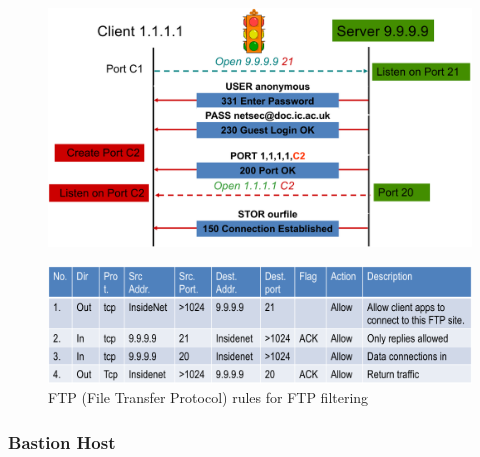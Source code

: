 \documentclass[twocolumn,landscape,10pt]{article}
\theoremstyle{definition}
\begin{document}
\begin{figure}[h]
  	\includegraphics[scale=0.24]{filtering_ftp.png}
  	\centering
\end{figure}
\begin{figure}[h]
  	\includegraphics[scale=0.30]{ftp_rules.png}
  	\centering
    \caption{FTP (File Transfer Protocol) rules for FTP filtering}
\end{figure}

\subsubsection{Bastion Host}
\end{document}
